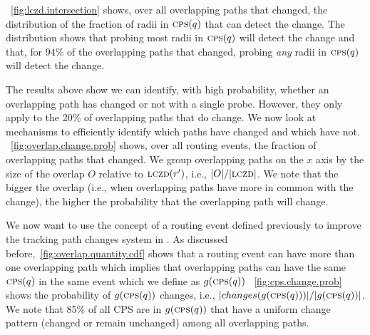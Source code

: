 


\figstr~\ref{fig:lczd.intersection} shows, over all overlapping
paths that changed, the distribution of the fraction of radii in
$\mathrm{\textsc{cps}}(q)$ that can detect the change.  The distribution shows that
probing most radii in $\mathrm{\textsc{cps}}(q)$ will detect the change and
that, for 94\% of the overlapping paths that changed, probing
\emph{any} radii in $\mathrm{\textsc{cps}}(q)$ will detect the change.

 The results above show we
can identify, with high probability, whether an overlapping path has
changed or not with a single probe.  However, they only apply to the
20\% of overlapping paths that do change.  We now look at mechanisms
to efficiently identify which paths have changed and which have not.
\figstr~\ref{fig:overlap.change.prob} shows, over all routing
events, the fraction of overlapping paths that changed.  We group
overlapping paths on the $x$ axis by the size of the overlap $O$
relative to $\mathrm{\textsc{lczd}}(r')$, i.e., $|O|/|\mathrm{\textsc{lczd}}|$.  We note that the
bigger the overlap (i.e., when overlapping paths have more in common
with the change), the higher the probability that the overlapping
path will change.  

 We
now want to use the concept of a routing event defined
previously to improve the tracking path changes system
in \dtrack. As discussed before,\figstr~\ref{fig:overlap.quantity.cdf}  
shows that a routing event can have more than one overlapping path
which implies that overlapping paths can have the same
$\mathrm{\textsc{cps}}(q)$ in the same event which we define as $g(\mathrm{\textsc{cps}}(q))$
\figstr~\ref{fig:cps.change.prob} shows the probability of 
$g(\mathrm{\textsc{cps}}(q))$ changes, i.e., $|changes(g(\mathrm{\textsc{cps}}(q)))|/|g(\mathrm{\textsc{cps}}(q))|$. 
We note that 85\% of all CPS are in $g(\mathrm{\textsc{cps}}(q))$ that have a uniform change
pattern (changed or remain unchanged) among all overlapping
paths. 

